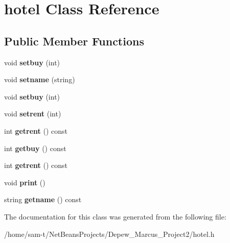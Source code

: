 \hypertarget{classhotel}{}\section{hotel Class Reference}
\label{classhotel}
\subsection*{Public Member Functions}
\begin{DoxyCompactItemize}
\item 
\mbox{\label{classhotel_ab4d2f46e446d0b4d89736deb7bd0db7f}} 
void {\bfseries setbuy} (int)
\item 
\mbox{\label{classhotel_a9761e125f5d83995683d4ec98493af4f}} 
void {\bfseries setname} (string)
\item 
\mbox{\label{classhotel_ab4d2f46e446d0b4d89736deb7bd0db7f}} 
void {\bfseries setbuy} (int)
\item 
\mbox{\label{classhotel_a059f76ff8af9f86814184c62881e4db1}} 
void {\bfseries setrent} (int)
\item 
\mbox{\label{classhotel_a7eb3a754228930ee685ffc9574f2e0ae}} 
int {\bfseries getrent} () const
\item 
\mbox{\label{classhotel_a5bb06a954e7fb6b9b9291919111c4d1e}} 
int {\bfseries getbuy} () const
\item 
\mbox{\label{classhotel_a7eb3a754228930ee685ffc9574f2e0ae}} 
int {\bfseries getrent} () const
\item 
\mbox{\label{classhotel_aa701a26682b4f031fe9e41991856e3c4}} 
void {\bfseries print} ()
\item 
\mbox{\label{classhotel_a7da0151918233b35a58f58a777385a79}} 
string {\bfseries getname} () const
\end{DoxyCompactItemize}


The documentation for this class was generated from the following file\+:\begin{DoxyCompactItemize}
\item 
/home/sam-\/t/\+Net\+Beans\+Projects/\+Depew\+\_\+\+Marcus\+\_\+\+Project2/hotel.\+h\end{DoxyCompactItemize}
